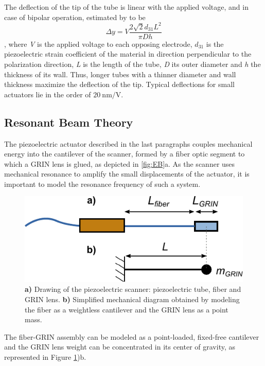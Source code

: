 {The deflection of the tip of the tube is linear with the applied voltage, and in case of bipolar operation, estimated by \cite{Chen} to be
$$ \Delta y = V  \frac{2 \sqrt{2} d_{31} L^2}{\pi D h} $$
, where \textit{V} is the applied voltage to each opposing electrode, $d_{31}$ is the piezoelectric strain coefficient of the material in direction perpendicular to the polarization direction, \textit{L} is the length of the tube, \textit{D} its outer diameter and \textit{h} the thickness of its wall. Thus, longer tubes with a thinner diameter and wall thickness maximize the deflection of the tip. Typical deflections for small actuators lie in the order of $\SI{20}{\nano\meter / \volt}$.


\subsection{Resonant Beam Theory}
\label{sec:EB}
The piezoelectric actuator described in the last paragraphs couples mechanical energy into the cantilever of the scanner, formed by a fiber optic segment to which a GRIN lens is glued, as depicted in \autoref{fig:EB}a. As the scanner uses mechanical resonance to amplify the small displacements of the actuator, it is important to model the resonance frequency of such a system. 

\begin{figure}[h!]\centering
      \includegraphics{figures/20_Theory/Mechanical/EB.pdf}
      \caption{\textbf{a)} Drawing of the piezoelectric scanner: piezoelectric tube, fiber and GRIN lens. 
      \textbf{b)} Simplified mechanical diagram obtained by modeling the fiber as a weightless cantilever and the GRIN lens as a point mass.}
      \label{fig:EB}
\end{figure}

The fiber-GRIN assembly can be modeled as a point-loaded, fixed-free cantilever and the GRIN lens weight can be concentrated in its center of gravity, as represented in Figure \ref{fig:EB})b. 

}
